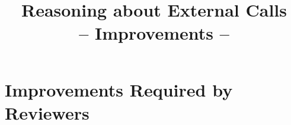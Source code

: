 \documentclass{article}
\begin{document}
\title{Reasoning about External Calls\\ \small{ -- Improvements --}} %













\maketitle 



\section{ Improvements Required by Reviewers}
\end{document}
